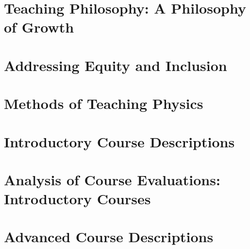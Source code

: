 \documentclass[../../main.tex]{subfiles}
\begin{document}
\label{sec:teaching}

\section{Teaching Philosophy: A Philosophy of Growth}

\begin{flushleft}

\end{flushleft}

\section{Addressing Equity and Inclusion}

\begin{flushleft}

\end{flushleft}

\section{Methods of Teaching Physics}

\begin{flushleft}

\end{flushleft}

\section{Introductory Course Descriptions}

\begin{flushleft}

\end{flushleft}

\section{Analysis of Course Evaluations: Introductory Courses}

\begin{flushleft}

\end{flushleft}

\section{Advanced Course Descriptions}

\begin{flushleft}

\end{flushleft}
\end{document}
